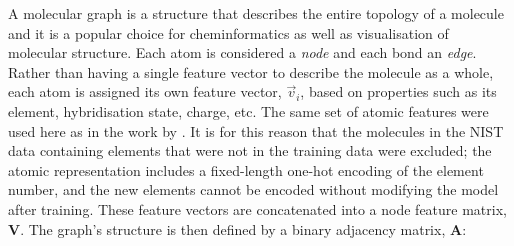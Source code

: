 




A molecular graph is a structure that describes the entire topology of a
molecule and it is a popular choice for cheminformatics as well as visualisation
of molecular structure. Each atom is considered a \emph{node} and each bond an
\emph{edge}. Rather than having a single feature vector to describe the molecule
as a whole, each atom is assigned its own feature vector, $\vec{v}_i$, based on
properties such as its element, hybridisation state, charge, etc. The same set
of atomic features were used here as in the work by
\citet{qinPredictingCriticalMicelle2021}. It is for this reason that the
molecules in the NIST data containing elements that were not in the training
data were excluded; the atomic representation includes a fixed-length one-hot
encoding of the element number, and the new elements cannot be encoded without
modifying the model after training. These feature vectors are concatenated into
a node feature matrix, $\mathbf{V}$. The graph's structure is then defined by a
binary adjacency matrix, $\mathbf{A}$:

